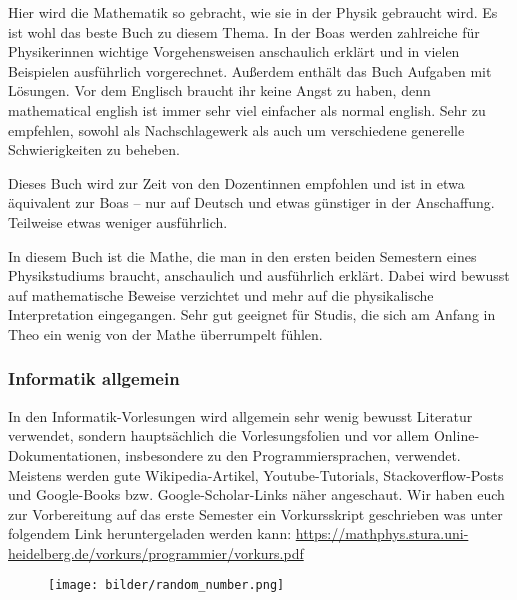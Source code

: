 \begin{description}[style=unboxed]
\item[Boas: Mathematical Methods in the Physical Science]{
		Hier wird die Mathematik so gebracht, wie sie in der Physik gebraucht wird. Es ist wohl das beste Buch zu diesem Thema. In der Boas werden zahlreiche für Physikerinnen wichtige Vorgehensweisen anschaulich erklärt und in vielen Beispielen ausführlich vorgerechnet. Außerdem enthält das Buch Aufgaben mit Lösungen. Vor dem Englisch braucht ihr keine Angst zu haben, denn mathematical english ist immer sehr viel einfacher als normal english. Sehr zu empfehlen, sowohl als Nachschlagewerk als auch um verschiedene generelle Schwierigkeiten zu beheben.}

\item[Lang, Pucker: Mathematische Methoden in der Physik]{
		Dieses Buch wird zur Zeit von den Dozentinnen empfohlen und ist in etwa äquivalent zur Boas -- nur auf Deutsch und etwas günstiger in der Anschaffung. Teilweise etwas weniger ausführlich.}

\item[Otto: Rechenmethoden für Studierende d. Physik im ersten Jahr]{
		In diesem Buch ist die Mathe, die man in den ersten beiden Semestern eines Physikstudiums braucht, anschaulich und ausführlich erklärt. Dabei wird bewusst auf mathematische Beweise verzichtet und mehr auf die physikalische Interpretation eingegangen. Sehr gut geeignet für Studis, die sich am Anfang in Theo ein wenig von der Mathe überrumpelt fühlen.}
\end{description}

\subsubsection{Informatik allgemein}
In den Informatik-Vorlesungen wird allgemein sehr wenig bewusst Literatur verwendet, sondern hauptsächlich die Vorlesungsfolien und vor allem Online-Dokumentationen, insbesondere zu den Programmiersprachen, verwendet. Meistens werden gute Wikipedia-Artikel, Youtube-Tutorials, Stackoverflow-Posts und Google-Books bzw. Google-Scholar-Links näher angeschaut. Wir haben euch zur Vorbereitung auf das erste Semester ein Vorkursskript geschrieben was unter folgendem Link heruntergeladen werden kann:  \url{https://mathphys.stura.uni-heidelberg.de/vorkurs/programmier/vorkurs.pdf}

\begin{figure}[b]
\centering
\texttt{[image: bilder/random\_number.png]}

\end{figure}

